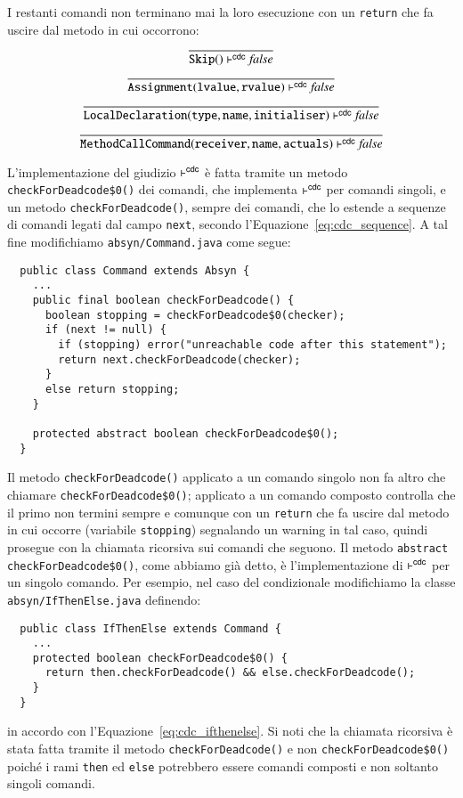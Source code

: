 I restanti comandi non terminano mai la loro esecuzione con un \texttt{return}
che fa uscire dal metodo in cui occorrono:
%
\[
  \frac{}{\mathtt{Skip()}\vdash^{\mathsf{cdc}}\mathit{false}}
\]
\[
  \frac{}{\mathtt{Assignment(lvalue,rvalue)}\vdash^{\mathsf{cdc}}\mathit{false}}
\]
\[
  \frac{}{\mathtt{LocalDeclaration(type,name,initialiser)}\vdash^{\mathsf{cdc}}\mathit{false}}
\]
\[
  \frac{}{\mathtt{MethodCallCommand(receiver,name,actuals)}\vdash^{\mathsf{cdc}}
    \mathit{false}}
\]

L'implementazione del giudizio $\vdash^{\mathsf{cdc}}$ \`e fatta tramite un metodo
\texttt{checkForDeadcode\$0()} dei comandi,
che implementa $\vdash^{\mathsf{cdc}}$ per comandi singoli,
e un metodo \texttt{checkForDeadcode()}, sempre dei comandi,
che lo estende a sequenze di comandi legati dal campo \texttt{next}, secondo
l'Equazione~\eqref{eq:cdc_sequence}. A tal fine modifichiamo
\texttt{absyn/Command.java} come segue:
%
\begin{verbatim}
  public class Command extends Absyn {
    ...
    public final boolean checkForDeadcode() {
      boolean stopping = checkForDeadcode$0(checker);
      if (next != null) {
        if (stopping) error("unreachable code after this statement");
        return next.checkForDeadcode(checker);
      }
      else return stopping;
    }

    protected abstract boolean checkForDeadcode$0();
  }
\end{verbatim}
Il metodo \texttt{checkForDeadcode()} applicato a un comando singolo
non fa altro che chiamare \texttt{checkForDeadcode\$0()}; applicato a un
comando composto controlla che il primo non termini sempre e comunque con
un \texttt{return} che fa uscire dal metodo in cui occorre
(variabile \texttt{stopping}) segnalando un warning in tal caso, quindi
prosegue con la chiamata ricorsiva sui comandi che seguono.
Il metodo \texttt{abstract} \texttt{checkForDeadcode\$0()}, come abbiamo gi\`a
detto, \`e l'implementazione di $\vdash^{\mathsf{cdc}}$ per un singolo comando. Per
esempio, nel caso del condizionale modifichiamo la classe
\texttt{absyn/IfThenElse.java} definendo:
%
\begin{verbatim}
  public class IfThenElse extends Command {
    ...
    protected boolean checkForDeadcode$0() {
      return then.checkForDeadcode() && else.checkForDeadcode();
    }
  }
\end{verbatim}
in accordo con l'Equazione~\eqref{eq:cdc_ifthenelse}. Si noti che la
chiamata ricorsiva \`e stata fatta tramite il metodo
\texttt{checkForDeadcode()} e non
\texttt{checkForDeadcode\$0()} poich\'e i rami \texttt{then} ed \texttt{else}
potrebbero essere comandi composti e non soltanto singoli comandi.

